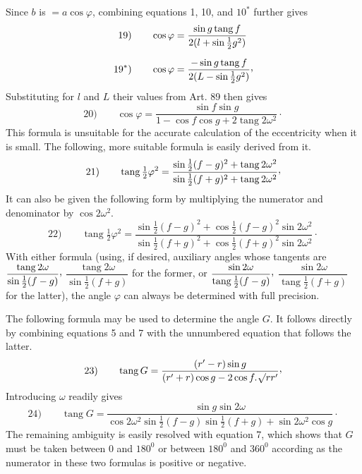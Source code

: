 Since $b$ is $=a\cos\varphi$, combining equations 1, 10, and $10^{\ast}$ further gives
\[
\begin{aligned}
\mathrm{19)}\qquad \cos\varphi&=\dfrac{\sin g\operatorname{tang}f}{2(l+\sin\frac12 g^2)}\\[6pt]
\mathrm{19}^{\ast}\mathrm{)}\qquad \cos\varphi&=\dfrac{-\sin g\operatorname{tang}f}{2(L-\sin\frac12 g^2)}\mathpunct{\raisebox{.45ex}{,}}
\end{aligned}
\]
Substituting for $l$ and $L$ their values from Art. 89 then gives
\[
\mathrm{20)}\qquad \cos\varphi=\dfrac{\sin f\sin g}{1-\cos f\cos g+2\operatorname{tang}2\omega^2}\mathpunct{\cdot}
\]
This formula is unsuitable for the accurate calculation of the eccentricity when it is small. The following, more suitable formula is easily derived from it.
\[
\mathrm{21)}\qquad \operatorname{tang}\tfrac12\varphi^2=\dfrac{\sin\frac12(f-g)^2+\operatorname{tang}2\omega^2}{\sin\frac12(f+g)^2+\operatorname{tang}2\omega^2}\mathpunct{\raisebox{.45ex}{,}}
\]
It can also be given the following form by multiplying the numerator and denominator by $\cos 2\omega^2$.
\[
\mathrm{22)}\qquad \operatorname{tang}\tfrac12\varphi^2=\dfrac{\sin\frac12(f-g)^2+\cos\frac12(f-g)^2\sin 2\omega^2}{\sin\frac12(f+g)^2+\cos\frac12(f+g)^2\sin 2\omega^2}\mathpunct{\cdot}
\]
With either formula (using, if desired, auxiliary angles whose tangents are $\dfrac{\operatorname{tang}2\omega}{\sin\frac12(f-g)}\mathpunct{\raisebox{.45ex}{,}}$ $\dfrac{\operatorname{tang}2\omega}{\sin\frac12(f+g)}$ for the former, or $\dfrac{\sin 2\omega}{\operatorname{tang}\frac12(f-g)}\mathpunct{\raisebox{.45ex}{,}}$ $\dfrac{\sin 2\omega}{\operatorname{tang}\frac12(f+g)}$ for the latter), the angle $\varphi$ can always be determined with full precision.

The following formula may be used to determine the angle $G$. It follows directly by combining equations 5 and 7 with the unnumbered equation that follows the latter.
\[
\mathrm{23)}\qquad \operatorname{tang}G=\dfrac{(r'-r)\sin g}{(r'+r)\cos g-2\cos f\mathpunct{.}\BareRoot{rr'}}\mathpunct{\raisebox{.45ex}{,}}
\]
Introducing $\omega$ readily gives
\[
\mathrm{24)}\qquad \operatorname{tang}G=\dfrac{\sin g\sin 2\omega}{\cos 2\omega^2\sin\frac12(f-g)\sin\frac12(f+g)+\sin 2\omega^2\cos g}\mathpunct{\cdot}
\]
The remaining ambiguity is easily resolved with equation 7, which shows that $G$ must be taken between 0 and $180^0$ or between $180^0$ and $360^0$ according as the numerator in these two formulas is positive or negative.

